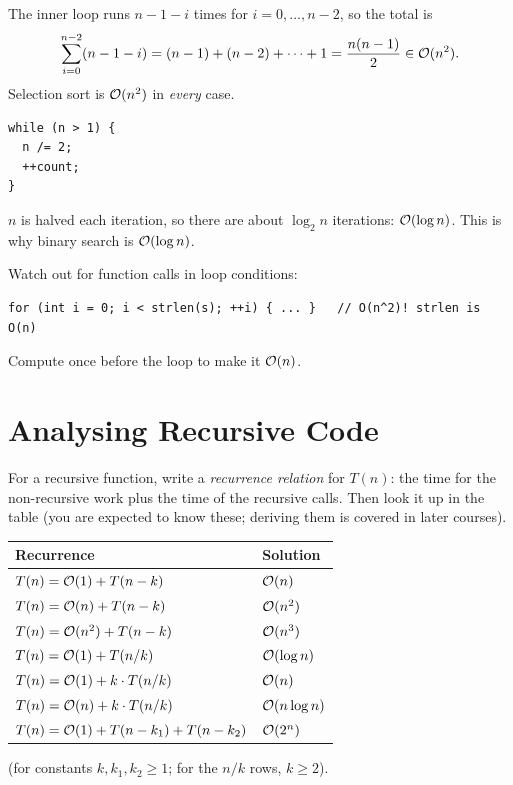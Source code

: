 \begin{example}
The inner loop runs $n - 1 - i$ times for $i = 0, \dots, n-2$, so the total is
\[ \sum_{i=0}^{n-2} (n - 1 - i) = (n-1) + (n-2) + \dots + 1 = \frac{n(n-1)}{2} \in \mathcal{O}(n^2). \]
Selection sort is $\mathcal{O}(n^2)$ in \emph{every} case.
\end{example}

\begin{example}
\begin{lstlisting}[style=c]
while (n > 1) {
  n /= 2;
  ++count;
}
\end{lstlisting}
$n$ is halved each iteration, so there are about $\log_2 n$ iterations: $\mathcal{O}(\log n)$. This is
why binary search is $\mathcal{O}(\log n)$.
\end{example}

\begin{important}
Watch out for function calls in loop conditions:
\begin{lstlisting}[style=c]
for (int i = 0; i < strlen(s); ++i) { ... }   // O(n^2)! strlen is O(n)
\end{lstlisting}
Compute  once before the loop to make it $\mathcal{O}(n)$.
\end{important}

\section{Analysing Recursive Code}

For a recursive function, write a \emph{recurrence relation} for $T(n)$: the time for the
non-recursive work plus the time of the recursive calls. Then look it up in the table (you are
expected to know these; deriving them is covered in later courses).

\begin{center}
\begin{tabular}{ll}
  \toprule
  Recurrence & Solution \\
  \midrule
  $T(n) = \mathcal{O}(1) + T(n-k)$ & $\mathcal{O}(n)$ \\
  $T(n) = \mathcal{O}(n) + T(n-k)$ & $\mathcal{O}(n^2)$ \\
  $T(n) = \mathcal{O}(n^2) + T(n-k)$ & $\mathcal{O}(n^3)$ \\
  $T(n) = \mathcal{O}(1) + T(n/k)$ & $\mathcal{O}(\log n)$ \\
  $T(n) = \mathcal{O}(1) + k \cdot T(n/k)$ & $\mathcal{O}(n)$ \\
  $T(n) = \mathcal{O}(n) + k \cdot T(n/k)$ & $\mathcal{O}(n \log n)$ \\
  $T(n) = \mathcal{O}(1) + T(n-k_1) + T(n-k_2)$ & $\mathcal{O}(2^n)$ \\
  \bottomrule
\end{tabular}
\end{center}
(for constants $k, k_1, k_2 \ge 1$; for the $n/k$ rows, $k \ge 2$).

